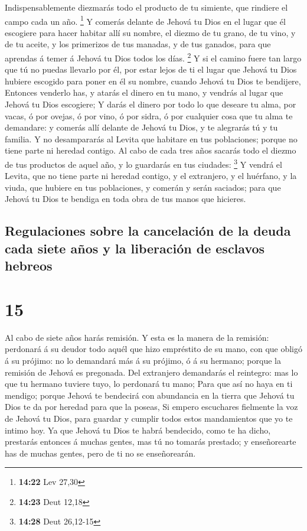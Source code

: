  Indispensablemente diezmarás todo el producto de tu
simiente, que rindiere el campo cada un año. \footnote{\textbf{14:22}
  Lev 27,30}  Y comerás delante de Jehová tu Dios en el
lugar que él escogiere para hacer habitar allí su nombre, el diezmo de
tu grano, de tu vino, y de tu aceite, y los primerizos de tus manadas, y
de tus ganados, para que aprendas á temer á Jehová tu Dios todos los
días. \footnote{\textbf{14:23} Deut 12,18}  Y si el
camino fuere tan largo que tú no puedas llevarlo por él, por estar lejos
de ti el lugar que Jehová tu Dios hubiere escogido para poner en él su
nombre, cuando Jehová tu Dios te bendijere,  Entonces
venderlo has, y atarás el dinero en tu mano, y vendrás al lugar que
Jehová tu Dios escogiere;  Y darás el dinero por todo lo
que deseare tu alma, por vacas, ó por ovejas, ó por vino, ó por sidra, ó
por cualquier cosa que tu alma te demandare: y comerás allí delante de
Jehová tu Dios, y te alegrarás tú y tu familia.  Y no
desampararás al Levita que habitare en tus poblaciones; porque no tiene
parte ni heredad contigo.  Al cabo de cada tres años
sacarás todo el diezmo de tus productos de aquel año, y lo guardarás en
tus ciudades: \footnote{\textbf{14:28} Deut 26,12-15}  Y
vendrá el Levita, que no tiene parte ni heredad contigo, y el
extranjero, y el huérfano, y la viuda, que hubiere en tus poblaciones, y
comerán y serán saciados; para que Jehová tu Dios te bendiga en toda
obra de tus manos que hicieres.

\hypertarget{regulaciones-sobre-la-cancelaciuxf3n-de-la-deuda-cada-siete-auxf1os-y-la-liberaciuxf3n-de-esclavos-hebreos}{%
\subsection{Regulaciones sobre la cancelación de la deuda cada siete
años y la liberación de esclavos
hebreos}\label{regulaciones-sobre-la-cancelaciuxf3n-de-la-deuda-cada-siete-auxf1os-y-la-liberaciuxf3n-de-esclavos-hebreos}}

\hypertarget{section-14}{%
\section{15}\label{section-14}}

 Al cabo de siete años harás remisión.  Y
esta es la manera de la remisión: perdonará á su deudor todo aquél que
hizo empréstito de su mano, con que obligó á su prójimo: no lo demandará
más á su prójimo, ó á su hermano; porque la remisión de Jehová es
pregonada.  Del extranjero demandarás el reintegro: mas lo
que tu hermano tuviere tuyo, lo perdonará tu mano;  Para
que así no haya en ti mendigo; porque Jehová te bendecirá con abundancia
en la tierra que Jehová tu Dios te da por heredad para que la poseas,
 Si empero escuchares fielmente la voz de Jehová tu Dios,
para guardar y cumplir todos estos mandamientos que yo te intimo hoy.
 Ya que Jehová tu Dios te habrá bendecido, como te ha
dicho, prestarás entonces á muchas gentes, mas tú no tomarás prestado; y
enseñorearte has de muchas gentes, pero de ti no se enseñorearán.

